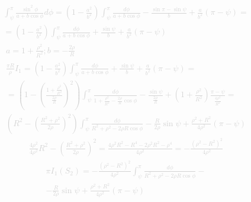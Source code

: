 %
\textcolor{lightgray}{ \begin{equation*} \begin{aligned}
\int_{\psi}^{\pi} \frac{\sin^2{\phi}}{a + b \cos \phi} d \phi =  
\left( 1 - \frac{a^2}{b^2} \right)
\int_{\psi}^{\pi} \frac{d \phi}{a + b \cos \phi} -
\frac{\sin \pi - \sin \psi}{b} + \frac{a}{b^2} (\pi - \psi) = \\
= \left( 1 - \frac{a^2}{b^2} \right)
\int_{\psi}^{\pi} \frac{d \phi}{a + b \cos \phi} +
\frac{\sin \psi}{b} + \frac{a}{b^2} (\pi - \psi)
\end{aligned} \end{equation*} }
%
\textcolor{lightgray}{ \begin{equation*} \begin{aligned}
a = 1 + \frac{\rho^2}{R^2}; b = - \frac{2 \rho}{ R } \\
\frac{\pi R}{\rho} I_1 = \left( 1 - \frac{a^2}{b^2} \right)
\int_{\psi}^{\pi} \frac{d \phi}{a + b \cos \phi} +
\frac{\sin \psi}{b} + \frac{a}{b^2} (\pi - \psi) = \\
= \left( 1 - \left( \frac{1 + \frac{\rho^2}{R^2}} 
{ \frac{2 \rho}{R} } \right)^2 \right) 
\int_{\psi}^{\pi} \frac{d \phi}{1 + \frac{\rho^2}{R^2} -  
\frac{2 \rho}{R} \cos \phi} -
\frac{\sin \psi}{\frac{2 \rho}{ R }} + \left( 1 + \frac{\rho^2}{R^2} \right) 
\frac{\pi - \psi}{\frac{4 \rho^2}{R^2}} = \\
\left( R^2 - \left( \frac{R^2 + \rho^2}{2 \rho} \right)^2 \right) 
\int_{\psi}^{\pi} \frac{d \phi}{R^2 + \rho^2 - 2 \rho R \cos \phi} -
\frac{R}{2 \rho} \sin \psi + \frac{\rho^2 + R^2}{4 \rho^2} (\pi - \psi)  
\end{aligned} \end{equation*} }
%
\textcolor{lightgray}{ \begin{equation*} \begin{aligned}
\frac{4 \rho^2}{4 \rho^2} R^2 - \left( \frac{R^2 + \rho^2}{2 \rho} \right)^2 =
\frac{4 \rho^2 R^2 - R^4 - 2 \rho^2 R^2 - \rho^4}{4 \rho^2} =
- \frac{\left( \rho^2 - R^2 \right)^2}{4 \rho^2} 
\end{aligned} \end{equation*} }
%
\textcolor{lightgray}{ \begin{equation*} \begin{aligned}
\pi I_1 (S_2) = - \frac{\left( \rho^2 - R^2 \right)^2}{4 \rho^2} 
\int_{\psi}^{\pi} \frac{d \phi}{R^2 + \rho^2 - 2 \rho R \cos \phi} - \\
- \frac{R}{2 \rho} \sin \psi + \frac{\rho^2 + R^2}{4 \rho^2}  (\pi - \psi)
\end{aligned} \end{equation*} }

